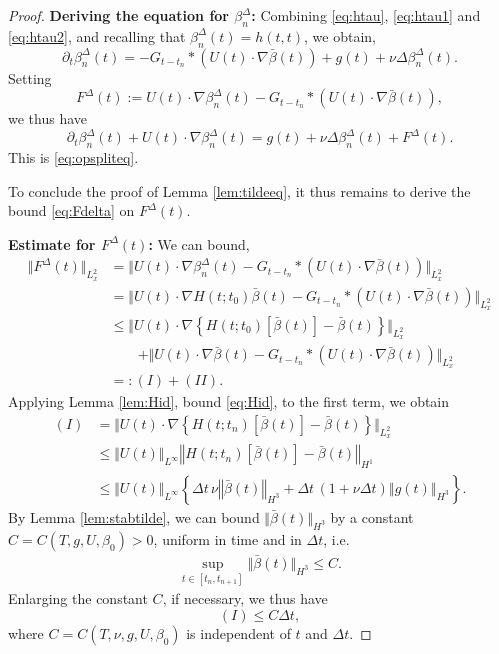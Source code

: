 \documentclass[reqno,12pt]{amsart}
\begin{document}
\begin{proof}
\textbf{Deriving the equation for $\beta^\Delta_n$:}
Combining \eqref{eq:htau}, \eqref{eq:htau1} and \eqref{eq:htau2}, and recalling that $\beta^{\Delta}_n(t) = h(t,t)$, we obtain,
\[
\partial_t \beta^{\Delta}_n(t)
=
-G_{t-t_n} \ast \left( U(t) \cdot \nabla \bar{\beta}(t) \right)
+
g(t) + \nu \Delta \beta^{\Delta}_n(t).
\]
Setting
\[
F^\Delta(t) :=
U(t) \cdot \nabla \beta^{\Delta}_n(t)
-G_{t-t_n} \ast \left( U(t) \cdot \nabla \bar{\beta}(t) \right),
\]
we thus have
\[
\partial_t \beta^{\Delta}_n(t)
+ U(t) \cdot \nabla \beta^{\Delta}_n(t)
=
g(t) + \nu \Delta \beta^{\Delta}_n(t) + F^\Delta(t).
\]
This is \eqref{eq:opspliteq}.

To conclude the proof of Lemma \ref{lem:tildeeq}, it thus remains to derive the bound \eqref{eq:Fdelta} on $F^\Delta(t)$.

\textbf{Estimate for $F^\Delta(t)$:} We can bound,
\begin{align*}
\Vert F^\Delta(t) \Vert_{L^2_x}
&=
\Vert
U(t) \cdot \nabla \beta^{\Delta}_n(t)
-G_{t-t_n} \ast \left( U(t) \cdot \nabla \bar{\beta}(t) \right)
\Vert_{L^2_x}
\\
&=
\Vert
U(t) \cdot \nabla H(t;t_0)\bar{\beta}(t)
-G_{t-t_n} \ast \left( U(t) \cdot \nabla \bar{\beta}(t) \right)
\Vert_{L^2_x}
\\
&\le
\Vert
U(t) \cdot \nabla \left\{ H(t;t_0)\left[\bar{\beta}(t)\right] - \bar{\beta}(t)\right\}
\Vert_{L^2_x}
\\
&\qquad
+
\Vert
U(t) \cdot \nabla \bar{\beta}(t)
-G_{t-t_n} \ast \left( U(t) \cdot \nabla \bar{\beta}(t) \right)
\Vert_{L^2_x}
\\
&=: (I) + (II).
\end{align*}
Applying Lemma \ref{lem:Hid}, bound \eqref{eq:Hid}, to the first term, we obtain
\begin{align*}
(I) &=
\big\Vert
U(t) \cdot \nabla \left\{ H(t;t_n)\left[\bar{\beta}(t)\right] - \bar{\beta}(t)\right\}
\big\Vert_{L^2_x}
\\
&\le
\Vert U(t) \Vert_{L^\infty}
\left\Vert H(t;t_n)[\bar{\beta}(t)] - \bar{\beta}(t) \right\Vert_{H^1}
\\
&\le \Vert U(t) \Vert_{L^\infty}
\left\{
\Delta t\, \nu  \left\Vert \bar{\beta}(t) \right\Vert_{H^3} + \Delta t\, (1+\nu \Delta t)  \left\Vert g(t) \right\Vert_{H^3}
\right\}.
\end{align*}
By Lemma \ref{lem:stabtilde}, we can bound $\Vert \bar{\beta}(t)\Vert_{H^3}$ by a constant $C = C(T, g, U, \beta_0)>0$, uniform in time and in $\Delta t$, i.e.
\begin{align}
\label{eq:bbb}
\sup_{t \in [t_n,t_{n+1}]} \Vert \bar{\beta}(t) \Vert_{H^3}
\le C.
\end{align}
Enlarging the constant $C$, if necessary, we thus have
\[
(I)
\le C \Delta t,
\]
where $C = C(T,\nu, g,U,\beta_0)$ is independent of $t$ and $\Delta t$.


\end{proof}
\end{document}
